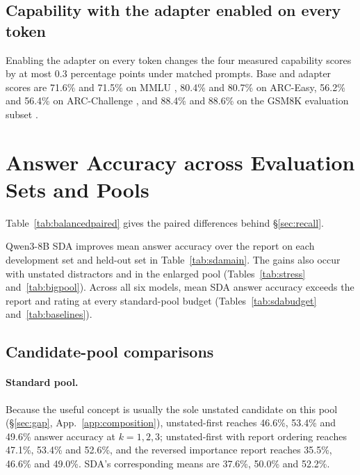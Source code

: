 \subsection{Capability with the adapter enabled on every token}
\label{app:capability}

Enabling the adapter on every token changes the four measured capability
scores by at most 0.3 percentage points under matched prompts.
Base and adapter scores are
71.6\% and 71.5\% on MMLU \citep{hendrycks2021mmlu}, 80.4\% and
80.7\% on ARC-Easy, 56.2\% and 56.4\% on ARC-Challenge
\citep{clark2018arc}, and 88.4\% and 88.6\% on the GSM8K evaluation
subset \citep{cobbe2021gsm8k}.
\section{Answer Accuracy across Evaluation Sets and Pools}
\label{app:recall}

Table~\ref{tab:balancedpaired} gives the paired differences behind
\S\ref{sec:recall}.



Qwen3-8B SDA improves mean answer accuracy over the report on each
development set and held-out set in Table~\ref{tab:sdamain}. The gains
also occur with unstated distractors and in the enlarged pool
(Tables~\ref{tab:stress} and~\ref{tab:bigpool}). Across all six models,
mean SDA answer accuracy exceeds the report and rating at every
standard-pool budget
(Tables~\ref{tab:sdabudget} and~\ref{tab:baselines}).












\subsection{Candidate-pool comparisons}
\label{app:poolresults}

\paragraph{Standard pool.}
Because the useful concept is usually the sole unstated candidate on
this pool (\S\ref{sec:gap}, App.~\ref{app:composition}), unstated-first
reaches 46.6\%, 53.4\% and 49.6\% answer accuracy at $k=1,2,3$;
unstated-first with report ordering reaches 47.1\%, 53.4\% and 52.6\%,
and the reversed importance report reaches 35.5\%, 46.6\% and 49.0\%.
SDA's corresponding means are 37.6\%, 50.0\% and 52.2\%.

